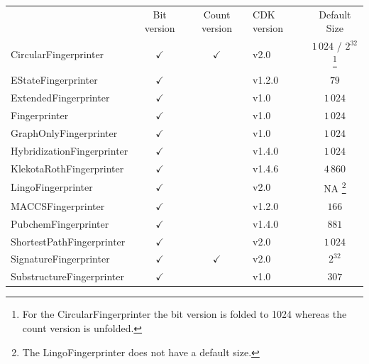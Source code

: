 \documentclass[10pt]{bmcart}
\def \cdkversion {v2.0}
\begin{document}
\begin{backmatter}
    \begin{minipage}{1\textwidth}
    \renewcommand*{\thempfootnote}{\fnsymbol{mpfootnote}}
    \centering
    \begin{tabular}{lcclc}
                             & Bit version  & Count version & CDK version & Default Size    \\
  CircularFingerprinter~\cite{rogers2010extended, Clark2014}      & $\checkmark$ & $\checkmark$  & \cdkversion{}     & $1\,024$ / $2^{32}$%
\footnote[1]{For the CircularFingerprinter the bit version is folded to 1024 whereas the count version is unfolded.} \\
  EStateFingerprinter~\cite{Hall1995}       & $\checkmark$ &               & v1.2.0       & $79$            \\
  ExtendedFingerprinter      & $\checkmark$ &               & v1.0         & $1\,024$        \\
  Fingerprinter              & $\checkmark$ &               & v1.0         & $1\,024$        \\
  GraphOnlyFingerprinter     & $\checkmark$ &               & v1.0         & $1\,024$        \\
  HybridizationFingerprinter & $\checkmark$ &               & v1.4.0       & $1\,024$        \\
  KlekotaRothFingerprinter~\cite{Klekota2008}   & $\checkmark$ &               & v1.4.6       & $4\,860$        \\
  LingoFingerprinter~\cite{vidal2005lingo}         & $\checkmark$ &               & \cdkversion{}     & NA%
\footnote[2]{The LingoFingerprinter does not have a default size.}
                                                                                             \\
  MACCSFingerprinter         & $\checkmark$ &               & v1.2.0       & $166$           \\
  PubchemFingerprinter~\cite{pubchemFP}       & $\checkmark$ &               & v1.4.0       & $881$            \\
  ShortestPathFingerprinter  & $\checkmark$ &               & \cdkversion{}     & $1\,024$        \\
  SignatureFingerprinter~\cite{signaturefingerprints}     & $\checkmark$ & $\checkmark$  & \cdkversion{}     & $2^{32}$         \\
  SubstructureFingerprinter  & $\checkmark$ &               & v1.0         & $307$           \\

    \end{tabular}
    \end{minipage}


\end{backmatter}
\end{document}
